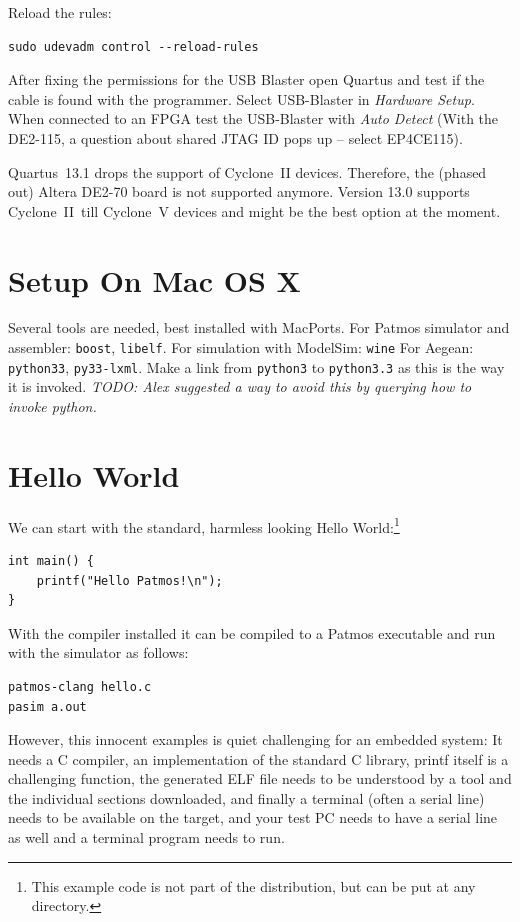 \documentclass[a4paper,fontsize=10pt,twoside,DIV15,BCOR12mm,headinclude=true,footinclude=false,pagesize,bibtotoc]{scrbook}
\newcommand{\code}[1]{{\texttt{#1}}}
\newcommand{\todo}[1]{{\emph{TODO: #1}}}
\begin{document}
Reload the rules:
\begin{verbatim}
sudo udevadm control --reload-rules
\end{verbatim}

After fixing the permissions for the USB Blaster open Quartus and test if the
cable is found with the programmer. Select USB-Blaster in \emph{Hardware Setup}.
When connected to an FPGA test the USB-Blaster with \emph{Auto Detect}
(With the DE2-115, a question about shared JTAG ID pops up -- select EP4CE115).

Quartus~13.1 drops the support of Cyclone~II devices. Therefore, the
(phased out) Altera DE2-70 board is not supported anymore. Version 13.0 supports Cyclone~II\
till Cyclone~V devices and might be the best option at the moment.

\section{Setup On Mac OS X}

Several tools are needed, best installed with MacPorts. For Patmos simulator and assembler:
\code{boost}, \code{libelf}.
For simulation with ModelSim: \code{wine}
For Aegean: \code{python33}, \code{py33-lxml}. Make a link from \code{python3} to \code{python3.3} as this is the way it is invoked.
\todo{Alex suggested a way to avoid this by querying how to invoke python.}

\section{Hello World}

We can start with the standard, harmless looking Hello
World:\footnote{This example code is not part of the distribution, but
can be put at any directory.}
\begin{lstlisting}
int main() {
    printf("Hello Patmos!\n");
}
\end{lstlisting}

With the compiler installed it can be compiled to a Patmos executable
and run with the simulator as follows:

\begin{verbatim}
patmos-clang hello.c
pasim a.out
\end{verbatim}

However, this innocent examples is quiet challenging for an embedded system:
It needs a C compiler, an implementation of the standard C library, printf
itself is a challenging function, the generated ELF file needs to be understood
by a tool and the individual sections downloaded, and finally a terminal (often
a serial line) needs to be available on the target, and your test PC needs to
have a serial line as well and a terminal program needs to run.
\end{document}
